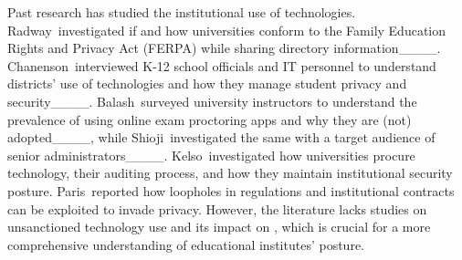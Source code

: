 Past research has studied the institutional use of technologies. Radway~\etal investigated if and how universities conform to the Family Education Rights and Privacy Act (FERPA) while sharing directory information____. Chanenson~\etal interviewed K-12 school officials and IT personnel to understand districts' use of technologies and how they manage student privacy and security____. Balash~\etal surveyed university instructors to understand the prevalence of using online exam proctoring apps and why they are (not) adopted____, while Shioji~\etal investigated the same with a target audience of senior administrators____. Kelso~\etal investigated how universities procure technology, their auditing process, and how they maintain institutional security posture. Paris~\etal reported how loopholes in regulations and institutional contracts can be exploited to invade privacy. However, the literature lacks studies on unsanctioned technology use and its impact on \SP, which is crucial for a more comprehensive understanding of educational institutes' \SP posture.